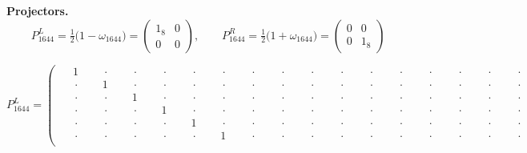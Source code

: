 \documentclass[
  10pt,
]{article}
\begin{document}
\textbf{Projectors.}
\[\boxed{\;P_{1644}^{L}=\tfrac12\big(1-\omega_{1644}\big)=\begin{pmatrix}1_8&0\\0&0\end{pmatrix},\qquad
P_{1644}^{R}=\tfrac12\big(1+\omega_{1644}\big)=\begin{pmatrix}0&0\\0&1_8\end{pmatrix}\;}\tag{1.8}\]

\[
P_{1644}^{L} = \left(\begin{array}{rrrrrrrr|rrrrrrrr}
\phantom{-}1 & \phantom{-}\cdot & \phantom{-}\cdot & \phantom{-}\cdot & \phantom{-}\cdot & \phantom{-}\cdot & \phantom{-}\cdot & \phantom{-}\cdot & \phantom{-}\cdot & \phantom{-}\cdot & \phantom{-}\cdot & \phantom{-}\cdot & \phantom{-}\cdot & \phantom{-}\cdot & \phantom{-}\cdot & \phantom{-}\cdot \\[-1.8pt]
\phantom{-}\cdot & \phantom{-}1 & \phantom{-}\cdot & \phantom{-}\cdot & \phantom{-}\cdot & \phantom{-}\cdot & \phantom{-}\cdot & \phantom{-}\cdot & \phantom{-}\cdot & \phantom{-}\cdot & \phantom{-}\cdot & \phantom{-}\cdot & \phantom{-}\cdot & \phantom{-}\cdot & \phantom{-}\cdot & \phantom{-}\cdot \\[-1.8pt]
\phantom{-}\cdot & \phantom{-}\cdot & \phantom{-}1 & \phantom{-}\cdot & \phantom{-}\cdot & \phantom{-}\cdot & \phantom{-}\cdot & \phantom{-}\cdot & \phantom{-}\cdot & \phantom{-}\cdot & \phantom{-}\cdot & \phantom{-}\cdot & \phantom{-}\cdot & \phantom{-}\cdot & \phantom{-}\cdot & \phantom{-}\cdot \\[-1.8pt]
\phantom{-}\cdot & \phantom{-}\cdot & \phantom{-}\cdot & \phantom{-}1 & \phantom{-}\cdot & \phantom{-}\cdot & \phantom{-}\cdot & \phantom{-}\cdot & \phantom{-}\cdot & \phantom{-}\cdot & \phantom{-}\cdot & \phantom{-}\cdot & \phantom{-}\cdot & \phantom{-}\cdot & \phantom{-}\cdot & \phantom{-}\cdot \\[-1.8pt]
\phantom{-}\cdot & \phantom{-}\cdot & \phantom{-}\cdot & \phantom{-}\cdot & \phantom{-}1 & \phantom{-}\cdot & \phantom{-}\cdot & \phantom{-}\cdot & \phantom{-}\cdot & \phantom{-}\cdot & \phantom{-}\cdot & \phantom{-}\cdot & \phantom{-}\cdot & \phantom{-}\cdot & \phantom{-}\cdot & \phantom{-}\cdot \\[-1.8pt]
\phantom{-}\cdot & \phantom{-}\cdot & \phantom{-}\cdot & \phantom{-}\cdot & \phantom{-}\cdot & \phantom{-}1 & \phantom{-}\cdot & \phantom{-}\cdot & \phantom{-}\cdot & \phantom{-}\cdot & \phantom{-}\cdot & \phantom{-}\cdot & \phantom{-}\cdot & \phantom{-}\cdot & \phantom{-}\cdot & \phantom{-}\cdot \\[-1.8pt]

\end{array}\]
\end{document}
